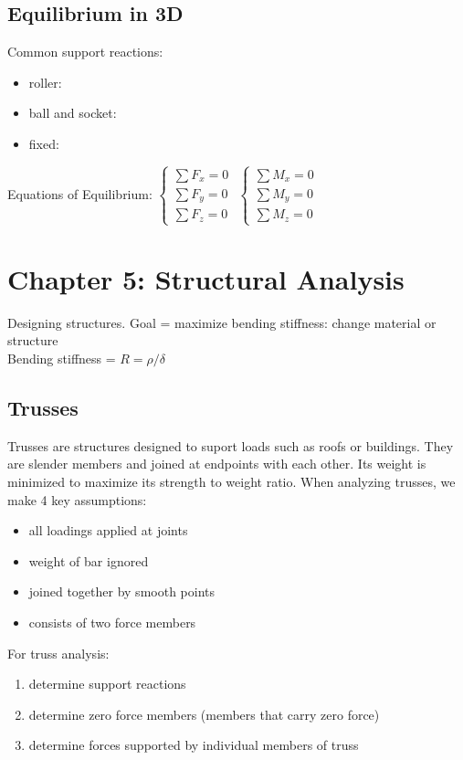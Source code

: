 \documentclass{article}
\begin{document}
    \subsection{Equilibrium in 3D}
    Common support reactions:
    \begin{itemize}
        \item roller:
        \item ball and socket:
        \item fixed:
    \end{itemize}
    Equations of Equilibrium:
    $\begin{cases}
        \sum F_x = 0 \\ \sum F_y = 0 \\ \sum F_z = 0
    \end{cases}$
    $\begin{cases}
        \sum M_x = 0 \\ \sum M_y = 0 \\ \sum M_z = 0
    \end{cases}$



    \section{Chapter 5: Structural Analysis}
    Designing structures. Goal = maximize bending stiffness: change material or structure\\
    Bending stiffness = $R = \rho / \delta$ 
    
    \subsection{Trusses}
    Trusses are structures designed to suport loads such as roofs or buildings. They are slender members and joined at endpoints with each other.
    Its weight is minimized to maximize its strength to weight ratio. When analyzing trusses, we make 4 key assumptions:
    \begin{itemize}
        \item all loadings applied at joints
        \item weight of bar ignored
        \item joined together by smooth points
        \item consists of two force members
    \end{itemize}
    For truss analysis:
    \begin{enumerate}
        \item determine support reactions
        \item determine zero force members (members that carry zero force)
        \item determine forces supported by individual members of truss
    \end{enumerate}
    
\end{document}
